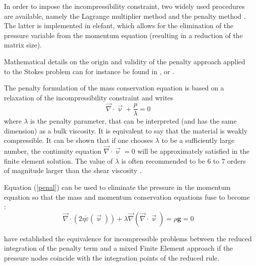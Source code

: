 \label{sec_penalty}


In order to impose the incompressibility constraint, two widely used procedures are available, namely the 
Lagrange multiplier method and the penalty method \cite{bathe82,hugh}. The latter is implemented in {\sc elefant}, which allows for the elimination of the pressure variable from the momentum equation (resulting in a reduction of the matrix size).%

Mathematical details on the origin and validity of the penalty approach applied to the Stokes problem can for instance be found in  \cite{cuss86}, \cite{redd82} or \cite{gunz89}.

The penalty formulation of the mass conservation equation is based on a relaxation of the incompressibility constraint and writes 
\begin{equation}
{\vec \nabla}\cdot {\vec \upnu} + \frac{p}{\lambda} = 0 \label{penal}
\end{equation}
where $\lambda$ is the penalty parameter, that can be interpreted (and has the same dimension) as a bulk viscosity. It is 
equivalent to say that the material is weakly compressible. It can be shown that if one chooses $\lambda$ to be a 
sufficiently large number, the continuity equation $ {\vec \nabla}\cdot {\vec \upnu} = 0$ will be approximately satisfied in the finite element solution. The value of $\lambda$ is often recommended to be 6 to 7 orders of magnitude larger than the shear viscosity \cite{dohu03,hulb79}.


Equation (\ref{penal}) can be used to eliminate the pressure in the momentum equation 
so that the mass and momentum conservation equations fuse to become :
\begin{equation}
{\vec \nabla}\cdot ( 2 \eta \dot\varepsilon({\vec \upnu})) 
+ \lambda {\vec \nabla} ({\vec \nabla }\cdot {\vec \upnu}) = \rho {\bm g} = 0 \label{peneq}
\end{equation}

\cite{mahu78} have established the equivalence for incompressible problems between the reduced integration
of the penalty term and a mixed Finite Element approach if the pressure nodes coincide with the integration points of the reduced rule.

